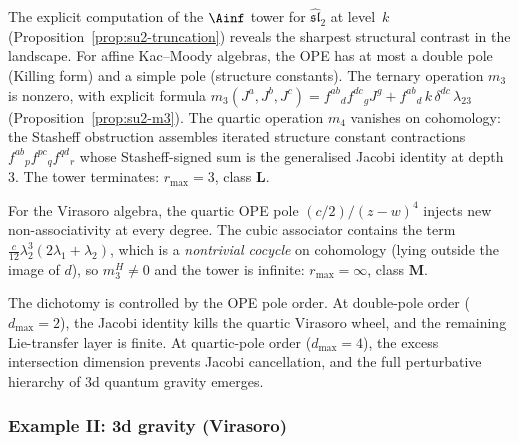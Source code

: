 \begin{remark}
\label{rem:ainf-truncation-dichotomy}
The explicit computation of the $\Ainf$ tower for
$\widehat{\mathfrak{sl}}_2$ at level~$k$
(Proposition~\ref{prop:su2-truncation}) reveals the sharpest
structural contrast in the landscape.
For affine Kac--Moody algebras, the OPE has at most a double pole
(Killing form) and a simple pole (structure constants).
The ternary operation $m_3$ is nonzero, with explicit formula
$m_3(J^a, J^b, J^c) = f^{ab}{}_d f^{dc}{}_g J^g
+ f^{ab}{}_d\, k\, \delta^{dc}\, \lambda_{23}$
(Proposition~\ref{prop:su2-m3}).
The quartic operation $m_4$ vanishes on cohomology: the
Stasheff obstruction assembles iterated structure constant
contractions $f^{ab}{}_p f^{pc}{}_q f^{qd}{}_r$ whose
Stasheff-signed sum is the generalised Jacobi identity at
depth~$3$. The tower terminates:
$r_{\max} = 3$, class $\mathbf{L}$.

For the Virasoro algebra, the quartic OPE pole
$(c/2)/(z-w)^4$ injects new non-associativity at every
degree. The cubic associator contains the term
$\tfrac{c}{12}\lambda_2^3(2\lambda_1 + \lambda_2)$,
which is a \emph{nontrivial cocycle} on cohomology
(lying outside the image of $d$), so
$m_3^H \ne 0$ and the tower is infinite:
$r_{\max} = \infty$, class $\mathbf{M}$.

The dichotomy is controlled by the OPE pole order.
At double-pole order ($d_{\max} = 2$), the Jacobi identity
kills the quartic Virasoro wheel, and the remaining Lie-transfer
layer is finite.
At quartic-pole order ($d_{\max} = 4$), the excess
intersection dimension prevents Jacobi cancellation, and
the full perturbative hierarchy of $3$d quantum gravity
emerges.
\end{remark}


\subsubsection{Example II: 3d gravity (Virasoro)}
\label{subsubsec:platonic-gravity}

